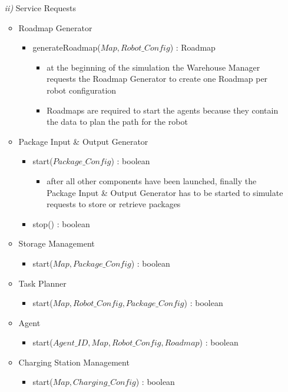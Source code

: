 \documentclass{article}
\begin{document}
\begin{enumerate}
  \item[\textit{ii)}] Service Requests
  \begin{itemize}
  	\item Roadmap Generator
  	\begin{itemize}
  		\item generateRoadmap($Map, Robot\_Config$) : Roadmap
  		\begin{itemize}
  			\item at the beginning of the simulation the Warehouse Manager requests the Roadmap Generator to create one Roadmap per robot configuration
			\item Roadmaps are required to start the agents because they contain the data to plan the path for the robot
  		\end{itemize}
  	\end{itemize}
  	\item Package Input \& Output Generator
	\begin{itemize}
		\item start($Package\_Config$) : boolean
		\begin{itemize}
			\item after all other components have been launched, finally the Package Input \& Output Generator has to be started to simulate requests to store or retrieve packages
		\end{itemize}
		\item stop() : boolean
	\end{itemize}
	\item Storage Management
	\begin{itemize}
		\item start($Map, Package\_Config$) : boolean
	\end{itemize}
	\item Task Planner
	\begin{itemize}
		\item start($Map, Robot\_Config, Package\_Config$) : boolean
	\end{itemize}
	\item Agent
	\begin{itemize}
		\item start($Agent\_ID, Map, Robot\_Config, Roadmap$) : boolean
	\end{itemize}
	\item Charging Station Management
	\begin{itemize}
		\item start($Map, Charging\_Config$) : boolean
	\end{itemize}
  \end{itemize}    
\end{enumerate}
\end{document}
